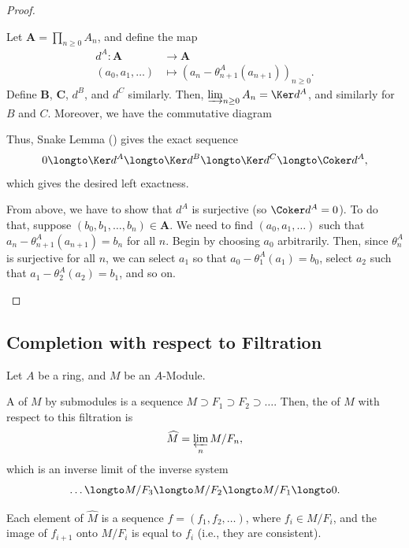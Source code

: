 \begin{proof}
    \begin{alphenum}
    \item 
    Let $\mathbf A = \prod_{n\geq 0} A_n$, and define 
    the map 
    \begin{align*}
    d^A : \mathbf A &\to \mathbf A \\
    (a_0,a_1,\dots) &\mapsto (a_n - \theta_{n+1}^A(a_{n+1}))_{n\geq 0}.
    \end{align*}
    Define $\mathbf B$, $\mathbf C$, $d^B$, and $d^C$ similarly.
    Then, $\varinjlim_{n\geq 0} A_n = \Ker d^A$,
    and similarly for $B$ and $C$. 
    Moreover, we have the commutative diagram
    \begin{center}
    \end{center}
    Thus, Snake Lemma () gives the exact sequence
    $$0\longto \Ker d^A \longto \Ker d^B \longto \Ker d^C
    \longto \Coker d^A,$$
    which gives the desired left exactness.
    \item From above, we have to show that $d^A$ is surjective
    (so $\Coker d^A = 0$).
    To do that, suppose $(b_0,b_1,\dots,b_n)\in\mathbf A$.
    We need to find $(a_0,a_1,\dots)$ such that
    $a_n - \theta_{n+1}^A(a_{n+1}) = b_n$ for all $n$.
    Begin by choosing $a_0$ arbitrarily.
    Then, since $\theta_n^A$ is surjective for all $n$,
    we can select $a_1$ so that $a_0 - \theta_1^A(a_1) = b_0$,
    select $a_2$ such that $a_1 - \theta_2^A(a_2)=b_1$,
    and so on.
    \qedhere
    \end{alphenum}
\end{proof}
%
%
%
\subsection{Completion with respect to Filtration}
Let $A$ be a ring, and $M$ be an $A$-Module.
\begin{definition}
A  of $M$ by submodules is a sequence
$M\supset F_1\supset F_2\supset\dots$.
Then, the  of $M$ with respect to
this filtration is
$$\widehat M = \varprojlim_n M/F_n,$$
which is an inverse limit of the inverse system
$$\dots\longto M/F_3\longto M/F_2\longto M/F_1\longto 0.$$
\end{definition}
Each element of $\widehat M$ is a sequence 
$f=(f_1,f_2,\dots)$, where $f_i\in M/F_i$,
and the image of $f_{i+1}$ onto $M/F_i$
is equal to $f_i$ (i.e., they are consistent).


